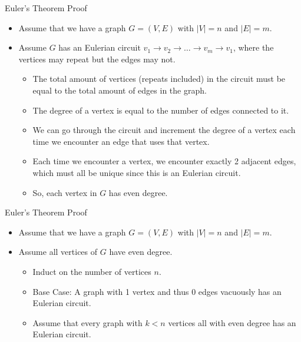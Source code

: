 \documentclass[aspectratio=169, handout]{beamer}
\begin{document}
\begin{frame}{Euler's Theorem Proof}
    \begin{itemize}
        \item Assume that we have a graph $G = (V, E)$ with $|V| = n$ and $|E| = m$.  \pause
        \item Assume $G$ has an Eulerian circuit $v_1 \to v_2 \to \dots \to v_m \to v_1$, where the vertices may repeat but the edges may not. \pause
        \begin{itemize}
            \item The total amount of vertices (repeats included) in the circuit must be equal to the total amount of edges in the graph. \pause
            \item The degree of a vertex is equal to the number of edges connected to it. \pause
            \item We can go through the circuit and increment the degree of a vertex each time we encounter an edge that uses that vertex. \pause
            \item Each time we encounter a vertex, we encounter exactly 2 adjacent edges, which must all be unique since this is an Eulerian circuit. \pause
            \item So, each vertex in $G$ has even degree.
        \end{itemize}
    \end{itemize}
\end{frame}

\begin{frame}{Euler's Theorem Proof}
    \begin{itemize}
        \item Assume that we have a graph $G = (V, E)$ with $|V| = n$ and $|E| = m$. \pause
        \item Assume all vertices of $G$ have even degree. \pause
        \begin{itemize}
            \item Induct on the number of vertices $n$. \pause
            \item Base Case: A graph with 1 vertex and thus 0 edges vacuously has an Eulerian circuit. \pause
            \item Assume that every graph with $k < n$ vertices all with even degree has an Eulerian circuit.
        \end{itemize}
    \end{itemize}
\end{frame}
\end{document}
